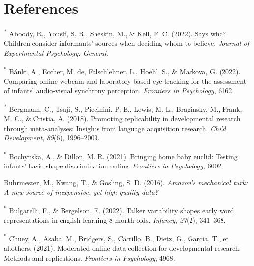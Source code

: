 \documentclass[
  man,floatsintext]{apa6}
\newlength{\cslhangindent}
\newlength{\cslentryspacingunit} %
\newenvironment{CSLReferences}[2] %
 {%
  \setlength{\parindent}{0pt}
  \ifodd #1
  \let\oldpar\par
  \def\par{\hangindent=\cslhangindent\oldpar}
  \fi
  \setlength{\parskip}{#2\cslentryspacingunit}
 }%
 {}
\begin{document}
\newpage

\hypertarget{references}{%
\section{References}\label{references}}

\hypertarget{refs}{}
\begin{CSLReferences}{1}{0}
\leavevmode{}%
\textsuperscript{*} Aboody, R., Yousif, S. R., Sheskin, M., \& Keil, F. C. (2022). Says who? Children consider informants' sources when deciding whom to believe. \emph{Journal of Experimental Psychology: General}.

\leavevmode{}%
\textsuperscript{*} Bánki, A., Eccher, M. de, Falschlehner, L., Hoehl, S., \& Markova, G. (2022). Comparing online webcam-and laboratory-based eye-tracking for the assessment of infants' audio-visual synchrony perception. \emph{Frontiers in Psychology}, 6162.

\leavevmode{}%
\textsuperscript{*} Bergmann, C., Tsuji, S., Piccinini, P. E., Lewis, M. L., Braginsky, M., Frank, M. C., \& Cristia, A. (2018). Promoting replicability in developmental research through meta-analyses: Insights from language acquisition research. \emph{Child Development}, \emph{89}(6), 1996--2009.

\leavevmode{}%
\textsuperscript{*} Bochynska, A., \& Dillon, M. R. (2021). Bringing home baby euclid: Testing infants' basic shape discrimination online. \emph{Frontiers in Psychology}, 6002.

\leavevmode{}%
Buhrmester, M., Kwang, T., \& Gosling, S. D. (2016). \emph{Amazon's mechanical turk: A new source of inexpensive, yet high-quality data?}

\leavevmode{}%
\textsuperscript{*} Bulgarelli, F., \& Bergelson, E. (2022). Talker variability shapes early word representations in english-learning 8-month-olds. \emph{Infancy}, \emph{27}(2), 341--368.

\leavevmode{}%
\textsuperscript{*} Chuey, A., Asaba, M., Bridgers, S., Carrillo, B., Dietz, G., Garcia, T., et al.others. (2021). Moderated online data-collection for developmental research: Methods and replications. \emph{Frontiers in Psychology}, 4968.


\end{CSLReferences}
\end{document}
